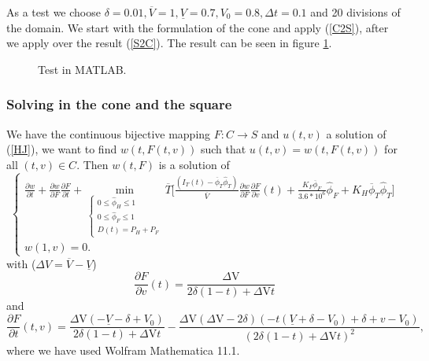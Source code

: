 \documentclass[12pt]{article}
\theoremstyle{definition}
\theoremstyle{remark}
\begin{document}
As a test we choose $\delta=0.01,\overline{V}=1,\underline{V}=0.7,V_0=0.8,\Delta t=0.1$ and 20 divisions of the domain. We start with the formulation of the cone and apply (\ref{C2S}), after we apply over the result (\ref{S2C}). The result can be seen in figure \ref{Results}.
\begin{figure}[ht!]
\centering
{}
\caption{Test in MATLAB.}
\label{Results}
\end{figure}

\subsubsection{Solving in the cone and the square}

We have the continuous bijective mapping $F:C\to S$ and $u(t,v)$ a solution of (\ref{HJ}), we want to find $w(t,F(t,v))$ such that $u(t,v)=w(t,F(t,v))$ for all $(t,v)\in C$. Then $w(t,F)$ is a solution of
\begin{equation*}
\begin{cases}
\frac{\partial w}{\partial t}+\frac{\partial w}{\partial F}\frac{\partial F}{\partial t}+\min_{\begin{cases}
0\leq\hat{\phi}_H\leq1\\
0\leq\hat{\phi}_F\leq1\\
D(t)=P_H+P_F
\end{cases}}\overline{T}\Bigg[\frac{(I_T(t)-\overline{\phi}_T\hat{\phi}_T)}{\overline{V}}\frac{\partial w}{\partial F}\frac{\partial F}{\partial v}(t)+\frac{K_F\overline{\phi}_F}{3.6*10^6}\hat{\phi}_F+K_H\overline{\phi}_T\hat{\phi}_T\Bigg]\\
w(1,v)=0.
\end{cases}
\end{equation*}
with ($\Delta V=\overline{V}-\underline{V}$)
\begin{equation*}
\frac{\partial F}{\partial v}(t)=\frac{\text{$\Delta $V}}{2 \delta  (1-t)+\text{$\Delta $V} t}
\end{equation*}
and
\begin{equation*}
\frac{\partial F}{\partial t}(t,v)=\frac{\text{$\Delta $V} \left(-\underline{V}-\delta +V_0\right)}{2 \delta  (1-t)+\text{$\Delta $V} t}-\frac{\text{$\Delta $V} (\text{$\Delta $V}-2 \delta ) \left(-t \left(\underline{V}+\delta -V_0\right)+\delta +v-V_0\right)}{(2 \delta  (1-t)+\text{$\Delta $V} t)^2},
\end{equation*}
where we have used Wolfram Mathematica 11.1.
\end{document}

